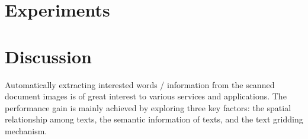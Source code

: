 \documentclass[10pt,twocolumn,letterpaper]{article}
\begin{document}
\section{Experiments}


\section{Discussion}
Automatically extracting interested words / information from the scanned document images is of great interest to various services and applications. The performance gain is mainly achieved by exploring three key factors: the spatial relationship among texts, the semantic information of texts, and the text gridding mechanism.

{\small


}
\end{document}
